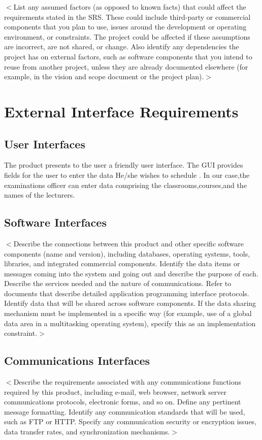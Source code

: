 \documentclass{scrreprt}
\begin{document}
$<$List any assumed factors (as opposed to known facts) that could affect the 
requirements stated in the SRS. These could include third-party or commercial 
components that you plan to use, issues around the development or operating 
environment, or constraints. The project could be affected if these assumptions 
are incorrect, are not shared, or change. Also identify any dependencies the 
project has on external factors, such as software components that you intend to 
reuse from another project, unless they are already documented elsewhere (for 
example, in the vision and scope document or the project plan).$>$


\chapter{External Interface Requirements}

\section{User Interfaces}
The product presents to the user a friendly user interface. The GUI provides fields for the user to enter the data He/she wishes to schedule . In our case,the examinations officer can enter data comprising the classrooms,courses,and the names of the lecturers.

 

\section{Software Interfaces}
$<$Describe the connections between this product and other specific software 
components (name and version), including databases, operating systems, tools, 
libraries, and integrated commercial components. Identify the data items or 
messages coming into the system and going out and describe the purpose of each.  
Describe the services needed and the nature of communications. Refer to 
documents that describe detailed application programming interface protocols.  
Identify data that will be shared across software components. If the data 
sharing mechanism must be implemented in a specific way (for example, use of a 
global data area in a multitasking operating system), specify this as an 
implementation constraint.$>$

\section{Communications Interfaces}
$<$Describe the requirements associated with any communications functions 
required by this product, including e-mail, web browser, network server 
communications protocols, electronic forms, and so on. Define any pertinent 
message formatting. Identify any communication standards that will be used, such 
as FTP or HTTP. Specify any communication security or encryption issues, data 
transfer rates, and synchronization mechanisms.$>$
\end{document}
